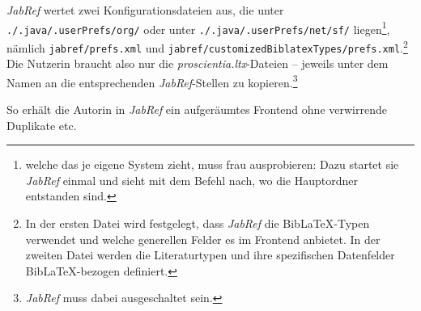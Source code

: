 \emph{JabRef} wertet zwei Konfigurationsdateien aus, die unter \texttt{./.java/.userPrefs/org/} oder unter \texttt{./.java/.userPrefs/net/sf/}  liegen\footnote{welche das je eigene System zieht, muss frau ausprobieren: Dazu startet sie \emph{JabRef} einmal und sieht mit dem Befehl  nach, wo die Hauptordner entstanden sind.}, nämlich \texttt{jabref/prefs.xml} und \texttt{jabref/customizedBiblatexTypes/prefs.xml}.\footnote{In der ersten Datei wird festgelegt, dass \emph{JabRef} die Bib\LaTeX-Typen verwendet und welche generellen Felder es im Frontend anbietet. In der zweiten Datei werden die Literaturtypen und ihre spezifischen Datenfelder Bib\LaTeX-bezogen definiert.} Die Nutzerin braucht also nur die \emph{proscientia.ltx}-Dateien -- jeweils unter dem Namen  an die entsprechenden \emph{JabRef}-Stellen zu kopieren.\footnote{\emph{JabRef} muss dabei ausgeschaltet sein.}

So erhält die Autorin in \emph{JabRef} ein aufgeräumtes Frontend ohne verwirrende Duplikate etc.
%
